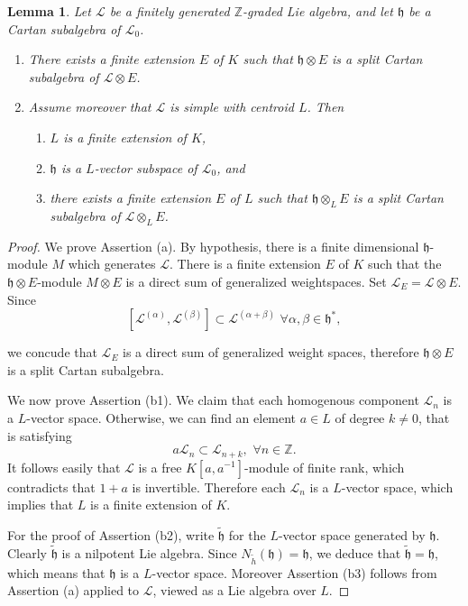\documentclass[11pt, letterpaper, reqno]{amsart}
\newtheorem{lemma}[theorem]{Lemma}
\theoremstyle{definition}
\newcommand{\Z}{{\mathbb Z}}
\newcommand{\cL}{\mathcal L}
\newcommand{\fh}{\mathfrak{h}}
\begin{document}
\begin{lemma}\label{split} Let $\cL$ be a finitely generated
$\Z$-graded Lie algebra, and let $\fh$ be a Cartan subalgebra of $\cL_0$.
\begin{enumerate} 
\item[(a)] There exists a finite extension $E$ of $K$ such that $\fh\otimes E$ is a split Cartan subalgebra of $\cL\otimes E$.
\item[(b)] Assume moreover that $\cL$ is simple with centroid $L$.  
Then 
\begin{enumerate}
\item[(b1)] $L$ is a finite extension of $K$,
\item[(b2)] $\fh$ is a $L$-vector subspace of $\cL_0$, and
\item[(b3)] there exists a finite extension $E$ of $L$ such that $\fh\otimes_L E$ is a split Cartan subalgebra of $\cL\otimes_L E$.
\end{enumerate}
\end{enumerate}
\end{lemma}





\begin{proof} We prove Assertion (a). By hypothesis, there is 
a finite dimensional $\fh$-module $M$ which generates $\cL$. There is a finite extension
$E$ of $K$ such that 
the $\fh\otimes E$-module $M\otimes E$ is a direct sum of generalized weightspaces. Set $\cL_E=\cL\otimes E$. Since
$$[\cL^{(\alpha)}, \cL^{(\beta)}]\subset \cL^{(\alpha+\beta)}
\,\,\forall \alpha,\beta\in\fh^*,$$

\noindent we concude that $\cL_E$ is a direct sum of generalized weight spaces, therefore $\fh\otimes E$ is a split Cartan subalgebra.

We now prove Assertion (b1). We claim that each
homogenous component $\cL_n$ is a $L$-vector space.
Otherwise, we can find an element $a\in L$
of degree $k\neq 0$, that is satisfying
 $$a\cL_n\subset \cL_{n+k},\,\,\forall n\in \Z.$$
It follows easily  that 
$\cL$ is a free $K[a,a^{-1}]$-module of finite rank,
which contradicts that
$1+a$ is  invertible. Therefore each  $\cL_n$ is a $L$-vector space, which implies that $L$ is a finite extension of $K$.

For the proof of Assertion (b2), write $\tilde{\fh}$ for the $L$-vector space generated by $\fh$. Clearly $\tilde{\fh}$ is a nilpotent Lie algebra. Since $N_{\tilde h}(\fh)=\fh$, we deduce that $\tilde{\fh}=\fh$, which means that $\fh$ is a $L$-vector space. 
Moreover Assertion (b3) follows from Assertion (a) applied to 
$\cL$, viewed as a
Lie algebra over $L$. 
\end{proof}
\end{document}
